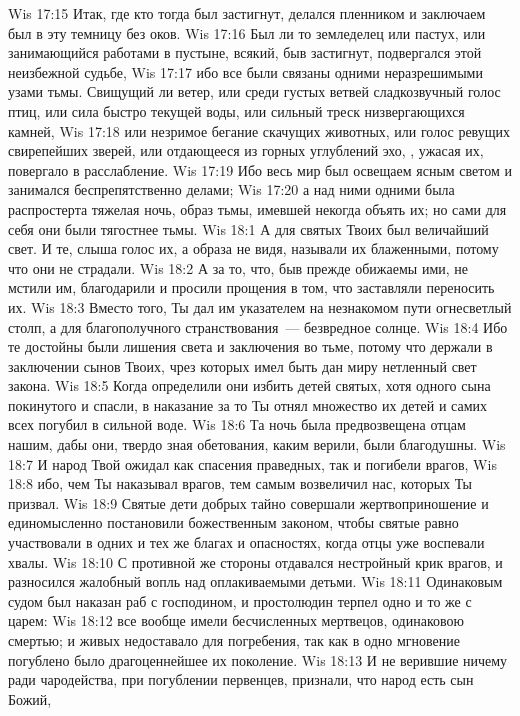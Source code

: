 \vs Wis 17:15 Итак, где кто тогда был застигнут, делался пленником и заключаем был в эту темницу без оков.
\vs Wis 17:16 Был ли то земледелец или пастух, или занимающийся работами в пустыне, всякий, быв застигнут, подвергался этой неизбежной судьбе,
\vs Wis 17:17 ибо все были связаны одними неразрешимыми узами тьмы. Свищущий ли ветер, или среди густых ветвей сладкозвучный голос птиц, или сила быстро текущей воды, или сильный треск низвергающихся камней,
\vs Wis 17:18 или незримое бегание скачущих животных, или голос ревущих свирепейших зверей, или отдающееся из горных углублений эхо, , ужасая их, повергало в расслабление.
\vs Wis 17:19 Ибо весь мир был освещаем ясным светом и занимался беспрепятственно делами;
\vs Wis 17:20 а над ними одними была распростерта тяжелая ночь, образ тьмы, имевшей некогда объять их; но сами для себя они были тягостнее тьмы.
\vs Wis 18:1 А для святых Твоих был величайший свет. И те, слыша голос их, а образа не видя, называли их блаженными, потому что они не страдали.
\vs Wis 18:2 А за то, что, быв прежде обижаемы ими, не мстили им, благодарили и просили прощения в том, что заставляли переносить их.
\vs Wis 18:3 Вместо того, Ты дал им указателем на незнакомом пути огнесветлый столп, а для благополучного странствования~--- безвредное солнце.
\vs Wis 18:4 Ибо те достойны были лишения света и заключения во тьме, потому что держали в заключении сынов Твоих, чрез которых имел быть дан миру нетленный свет закона.
\vs Wis 18:5 Когда определили они избить детей святых, хотя одного сына покинутого и спасли, в наказание за то Ты отнял множество их детей и самих всех погубил в сильной воде.
\vs Wis 18:6 Та ночь была предвозвещена отцам нашим, дабы они, твердо зная обетования, каким верили, были благодушны.
\vs Wis 18:7 И народ Твой ожидал как спасения праведных, так и погибели врагов,
\vs Wis 18:8 ибо, чем Ты наказывал врагов, тем самым возвеличил нас, которых Ты призвал.
\vs Wis 18:9 Святые дети добрых тайно совершали жертвоприношение и единомысленно постановили божественным законом, чтобы святые равно участвовали в одних и тех же благах и опасностях, когда отцы уже воспевали хвалы.
\vs Wis 18:10 С противной же стороны отдавался нестройный крик врагов, и разносился жалобный вопль над оплакиваемыми детьми.
\vs Wis 18:11 Одинаковым судом был наказан раб с господином, и простолюдин терпел одно и то же с царем:
\vs Wis 18:12 все вообще имели бесчисленных мертвецов,  одинаковою смертью; и живых недоставало для погребения, так как в одно мгновение погублено было  драгоценнейшее их поколение.
\vs Wis 18:13 И не верившие ничему ради чародейства, при погублении первенцев, признали, что  народ есть сын Божий,

